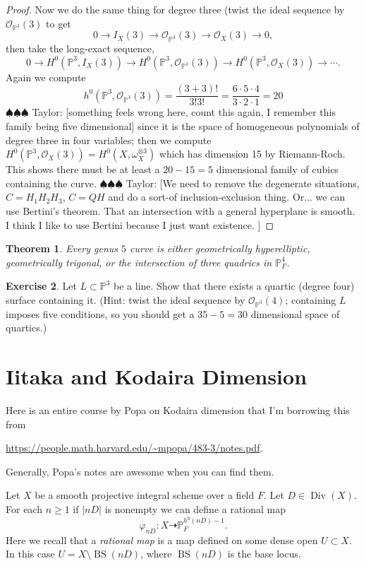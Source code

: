 \documentclass[12pt]{article}
\numberwithin{equation}{section}
\newtheorem{theorem}{Theorem}[subsection]
\theoremstyle{definition}
\newtheorem{exercise}[theorem]{Exercise}
\theoremstyle{remark}
\newcommand{\Ocal}{\mathcal{O}}
\newcommand{\PP}{\mathbb{P}}
\newcommand{\Div}{\operatorname{Div}}
\newcommand{\BS}{\operatorname{BS}}
\newcommand{\taylor}[1]{{\color{blue} \sf $\spadesuit\spadesuit\spadesuit$ Taylor: [#1]}}
\begin{document}
\begin{proof}
	 Now we do the same thing for degree three (twist the ideal sequence by $\Ocal_{\PP^3}(3)$ to get 
	  $$ 0 \to I_X(3) \to \Ocal_{\PP^3}(3) \to \Ocal_X(3) \to 0,$$
	then take the long-exact sequence,
	 $$0\to H^0(\PP^3,I_X(3) ) \to H^0(\PP^3,\Ocal_{\PP^3}(3)) \to H^0(\PP^3,\Ocal_X(3)) \to \cdots.$$
	Again we compute 
	$$h^0(\PP^3,\Ocal_{\PP^3}(3))= \frac{(3+3)!}{3!3!}=\frac{6\cdot 5 \cdot 4}{3\cdot 2 \cdot 1}=20$$ 
	\taylor{something feels wrong here, count this again, I remember this family being five dimensional} since it is the space of homogeneous polynomials of degree three in four variables; then we compute $H^0(\PP^3,\Ocal_X(3) )=H^0(X,\omega_X^{\otimes 3})$ which has dimension 15 by Riemann-Roch.
	This shows there must be at least a $20-15=5$ dimensional family of cubics containing the curve. 
	\taylor{We need to remove the degenerate situations, $C=H_1H_2H_3$, $C=QH$ and do a sort-of inclusion-exclusion thing.
	Or... we can use Bertini's theorem. 
	That an intersection with a general hyperplane is smooth. 
	I think I like to use Bertini because I just want existence.
		}
\end{proof}

\begin{theorem}
	Every genus $5$ curve is either geometrically hyperelliptic, geometrically trigonal, or the intersection of three quadrics in $\PP^4_F$. 
\end{theorem}

\begin{exercise}
	Let $L \subset \PP^3$ be a line. 
	Show that there exists a quartic (degree four) surface containing it. 
	(Hint: twist the ideal sequence by $\Ocal_{\PP^3}(4)$; containing $L$ imposes five conditions, so you should get a $35-5=30$ dimensional space of quartics.)
\end{exercise}

\section{Iitaka and Kodaira Dimension}
Here is an entire course by Popa on Kodaira dimension that I'm borrowing this from
\begin{center}
	\url{https://people.math.harvard.edu/~mpopa/483-3/notes.pdf}.
\end{center}
Generally, Popa's notes are awesome when you can find them.


Let $X$ be a smooth projective integral scheme over a field $F$.
Let $D \in \Div(X)$. 
For each $n\geq 1$ if $\vert nD \vert$ is nonempty we can define a rational map 
 $$ \varphi_{nD} : X \dashrightarrow \PP^{h^0(nD)-1}_F. $$
Here we recall that a \emph{rational map} is a map defined on some dense open $U\subset X$. 
 In this case $U = X\setminus \BS(nD)$, where $\BS(nD)$ is the base locus. 
\end{document}
